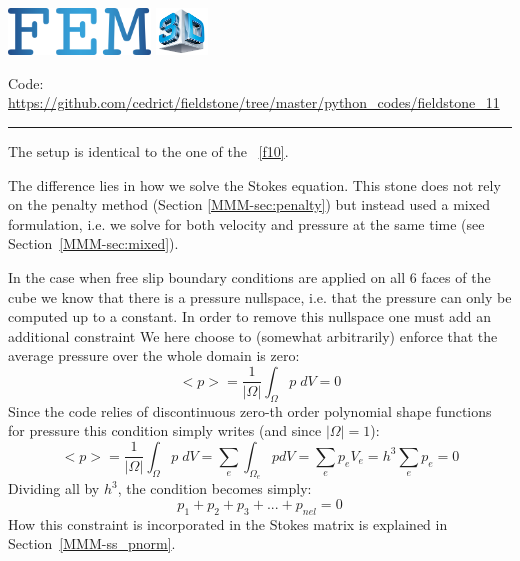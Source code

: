 
\includegraphics[height=1.25cm]{images/pictograms/FEM}
\includegraphics[height=1.25cm]{images/pictograms/3d}




\begin{center}
\inpython
{\small Code: \url{https://github.com/cedrict/fieldstone/tree/master/python_codes/fieldstone_11}}
\end{center}

\par\noindent\rule{\textwidth}{0.4pt}


The setup is identical to the one of the \stone~\ref{f10}.

The difference lies in how we solve the Stokes equation. This stone does not rely on 
the penalty method (Section \ref{MMM-sec:penalty}) 
but instead used a mixed formulation, i.e. we solve for both 
velocity and pressure at the same time (see Section~\ref{MMM-sec:mixed}).

In the case when free slip boundary conditions are applied on all 
6 faces of the cube we know that there is a pressure nullspace, i.e.
that the pressure can only be computed up to a constant. In order to 
remove this nullspace one must add an additional constraint 
We here choose to (somewhat arbitrarily) enforce that the average pressure 
over the whole domain is zero:
\[
<p>=\frac{1}{|\Omega|} \int_\Omega p \; dV =0 
\]
Since the code relies of discontinuous zero-th order polynomial shape functions 
for pressure this condition simply writes (and since $|\Omega|=1$):
\[
<p>=\frac{1}{|\Omega|} \int_\Omega p\;  dV 
=  \sum_{e} \int_{\Omega_e} p dV = \sum_e p_e V_e = h^3 \sum_e p_e =0
\]
Dividing all by $h^3$, the condition becomes simply:
\[
p_1 + p_2 + p_3 + ... + p_{nel} = 0
\]
How this constraint is incorporated in the Stokes matrix is explained in Section~\ref{MMM-ss_pnorm}.

